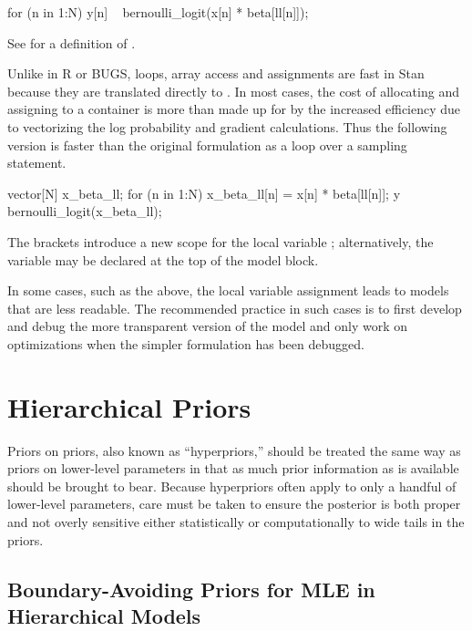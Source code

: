 \begin{stancode}
  for (n in 1:N)
    y[n] ~ bernoulli_logit(x[n] * beta[ll[n]]);
\end{stancode}
%
See  for a definition of
.

Unlike in R or BUGS, loops, array access and assignments are fast in
Stan because they are translated directly to \Cpp.  In most cases, the
cost of allocating and assigning to a container is more than made up
for by the increased efficiency due to vectorizing the log probability
and gradient calculations.  Thus the following version is faster than
the original formulation as a loop over a sampling statement.
%

\begin{stancode}
  {
    vector[N] x_beta_ll;
    for (n in 1:N)
      x_beta_ll[n] = x[n] * beta[ll[n]];
    y ~ bernoulli_logit(x_beta_ll);
  }
\end{stancode}
%
The brackets introduce a new scope for the local variable
; alternatively, the variable may be declared at the
top of the model block.

In some cases, such as the above, the local variable assignment leads
to models that are less readable.  The recommended practice in such
cases is to first develop and debug the more transparent version of
the model and only work on optimizations when the simpler formulation
has been debugged.


\section{Hierarchical Priors}\label{hierarchical-priors.section}

Priors on priors, also known as ``hyperpriors,'' should be treated the
same way as priors on lower-level parameters in that as much prior
information as is available should be brought to bear.  Because
hyperpriors often apply to only a handful of lower-level parameters,
care must be taken to ensure the posterior is both proper and not
overly sensitive either statistically or computationally to wide tails
in the priors.

\subsection{Boundary-Avoiding Priors for MLE in Hierarchical
Models}\label{bound-avoid-priors.subsection}

